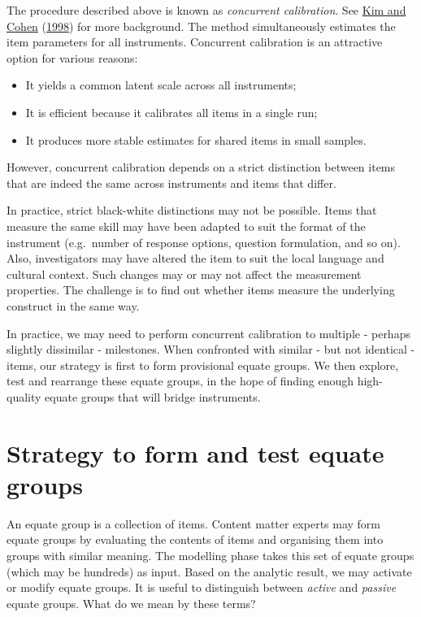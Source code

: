 \documentclass[
]{book}
\providecommand{\tightlist}{%
  \setlength{\itemsep}{0pt}\setlength{\parskip}{0pt}}
\begin{document}
The procedure described above is known as \emph{concurrent calibration}. See \protect\hyperlink{ref-kim1998}{Kim and Cohen} (\protect\hyperlink{ref-kim1998}{1998}) for more background. The method simultaneously estimates the item parameters for all instruments. Concurrent calibration is an attractive option for various reasons:

\begin{itemize}
\tightlist
\item
  It yields a common latent scale across all instruments;
\item
  It is efficient because it calibrates all items in a single run;
\item
  It produces more stable estimates for shared items in small samples.
\end{itemize}

However, concurrent calibration depends on a strict distinction between items that are indeed the same across instruments and items that differ.

In practice, strict black-white distinctions may not be possible. Items that measure the same skill may have been adapted to suit the format of the instrument (e.g.~number of response options, question formulation, and so on). Also, investigators may have altered the item to suit the local language and cultural context. Such changes may or may not affect the measurement properties. The challenge is to find out whether items measure the underlying construct in the same way.

In practice, we may need to perform concurrent calibration to multiple - perhaps slightly dissimilar - milestones. When confronted with similar - but not identical - items, our strategy is first to form provisional equate groups. We then explore, test and rearrange these equate groups, in the hope of finding enough high-quality equate groups that will bridge instruments.

\hypertarget{sec:equaterules}{%
\section{Strategy to form and test equate groups}\label{sec:equaterules}}

An equate group is a collection of items. Content matter experts may form equate groups by evaluating the contents of items and organising them into groups with similar meaning. The modelling phase takes this set of equate groups (which may be hundreds) as input. Based on the analytic result, we may activate or modify equate groups. It is useful to distinguish between \emph{active} and \emph{passive} equate groups. What do we mean by these terms?
\end{document}
